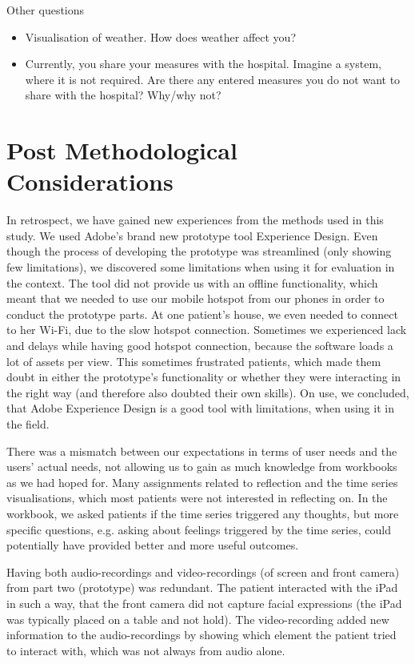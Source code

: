 Other questions
\begin{itemize}
\item Visualisation of weather. How does weather affect you?
\item Currently, you share your measures with the hospital. Imagine a system, where it is not required. Are there any entered measures you do not want to share with the hospital? Why/why not?
\end{itemize}

\section{Post Methodological Considerations}
In retrospect, we have gained new experiences from the methods used in this study. We used Adobe's brand new prototype tool Experience Design. Even though the process of developing the prototype was streamlined (only showing few limitations), we discovered some limitations when using it for evaluation in the context. The tool did not provide us with an offline functionality, which meant that we needed to use our mobile hotspot from our phones in order to conduct the prototype parts. At one patient's house, we even needed to connect to her Wi-Fi, due to the slow hotspot connection. Sometimes we  experienced lack and delays while having good hotspot connection, because the software loads a lot of assets per view. This sometimes frustrated patients, which made them doubt in either the prototype's functionality or whether they were interacting in the right way (and therefore also doubted their own skills). On use, we concluded, that Adobe Experience Design is a good tool with limitations, when using it in the field. 

There was a mismatch between our expectations in terms of user needs and the users' actual needs, not allowing us to gain as much knowledge from workbooks as we had hoped for. Many assignments related to reflection and the time series visualisations, which most patients were not interested in reflecting on. In the workbook, we asked patients if the time series triggered any thoughts, but more specific questions, e.g. asking about feelings triggered by the time series, could potentially have provided better and more useful outcomes. 

Having both audio-recordings and video-recordings (of screen and front camera) from part two (prototype) was redundant. The patient interacted with the iPad in such a way, that the front camera did not capture facial expressions (the iPad was typically placed on a table and not hold). The video-recording added new information to the audio-recordings by showing which element the patient tried to interact with, which was not always from audio alone. 